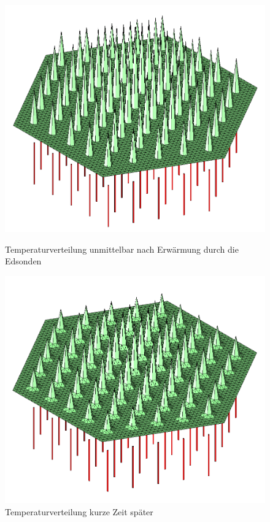 \documentclass[12pt,a4paper]{article}
\begin{document}
\begin{figure}[h]
    \begin{minipage}[t]{.4\linewidth} %
       \includegraphics[width=\linewidth]{TempAt0.png}
       \caption{Temperaturverteilung unmittelbar nach Erwärmung durch die Edsonden}
       \label{TempAt0}
    \end{minipage}
    \hspace{.1\linewidth}%
    \begin{minipage}[t]{.4\linewidth} %
       \includegraphics[width=\linewidth]{TempAt5.png}
       \caption{Temperaturverteilung kurze Zeit später}
       \label{TempAt5}
    \end{minipage}
 \end{figure}
\end{document}
